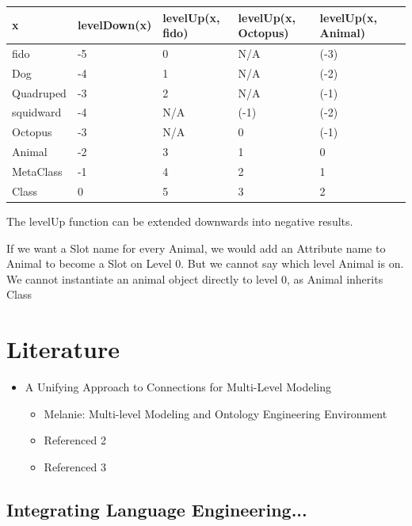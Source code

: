 \documentclass{scrreprt}
\newcounter{myCounter}[subsubsection]
\newcommand{\layerOne}[1]{\chapter{#1}}
\newcommand{\layerTwo}[1]{\section{#1} \setcounter{myCounter}{0}}
\begin{document}
\begin{tabular}[t]{|l|l|l|l|l|l|} \hline
x&levelDown(x)&levelUp(x, fido)&levelUp(x, Octopus)&levelUp(x, Animal) \\\hline
fido 				&-5&  0& N/A&(-3) \\\hline
Dog 				&-4&  1& N/A&(-2) \\\hline
Quadruped 	&-3&  2& N/A&(-1) \\\hline
squidward 	&-4&N/A&(-1)&(-2) \\\hline
Octopus 	  &-3&N/A&   0&(-1) \\\hline
Animal 			&-2&  3&   1&   0 \\\hline
MetaClass 	&-1&  4&   2&   1 \\\hline
Class 			& 0&  5&   3&   2 \\\hline
\hline
\end{tabular}

The levelUp function can be extended downwards into negative results.

\vspace{5mm}

If we want a Slot name for every Animal, we would add an Attribute name to Animal to become a Slot on Level 0. But we cannot say which level Animal is on.\\
We cannot instantiate an animal object directly to level 0, as Animal inherits Class


\layerOne{Literature}

\begin{itemize}
  \item A Unifying Approach to Connections for Multi-Level Modeling
  \cite{article:AtkinsonGerbigKuehne2015}
  \begin{itemize}
  \item Melanie: Multi-level Modeling and Ontology Engineering
  Environment \cite{article:AtkinsonGerbig2012}
  \item Referenced 2
  \item Referenced 3
\end{itemize}
\end{itemize}

\layerTwo{Integrating Language Engineering\cite{article:ClarkFrank0000}...}




\nocite{article:test}



\clearpage
{}
{}


\end{document}
